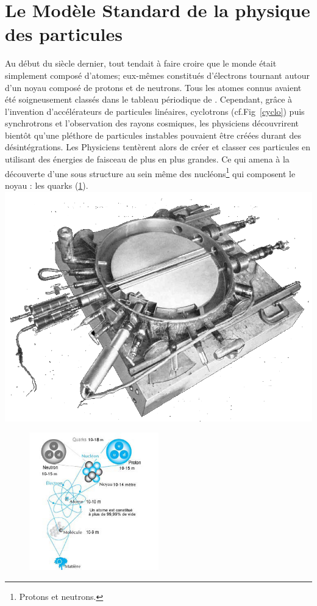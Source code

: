 \section{Le Modèle Standard de la physique des particules}
 
Au début du siècle dernier, tout tendait à faire croire que le monde était simplement composé d'atomes; eux-mêmes constitués d'électrons tournant autour d'un noyau composé de protons et de neutrons. Tous les atomes connus avaient été soigneusement classés dans le tableau périodique de . Cependant, grâce à l'invention d'accélérateurs de particules linéaires, cyclotrons (cf.Fig~\ref{cyclo}) puis synchrotrons et l'observation des rayons cosmiques, les physiciens découvrirent bientôt qu'une pléthore de particules instables pouvaient être créées durant des désintégrations. Les Physiciens tentèrent alors de créer et classer ces particules en utilisant des énergies de faisceau de plus en plus grandes. Ce qui amena à la découverte d'une sous structure au sein même des nucléons\footnote{Protons et neutrons.} qui composent le noyau : les quarks (\ref{structure}).
\marginpar
{
	\includegraphics[width=\marginparwidth]{SM/cyclotron.png}
    \label{cyclo}
}

\vspace*{-0.5cm}
\begin{figure}[ht!]
\centering
\includegraphics[width=0.50\textwidth]{SM/structure.jpg}
\label{structure}
\end{figure}

